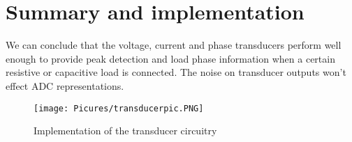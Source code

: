 


\vspace{-1cm}

\section{Summary and implementation}
We can conclude that the voltage, current and phase transducers perform well enough to provide peak detection and load phase information when a certain resistive or capacitive load is connected. The noise on transducer outputs won't effect ADC representations.

\begin{figure}[H]
    \centering
  	\texttt{[image: Picures/transducerpic.PNG]}
	\caption{Implementation of the transducer circuitry} \label{subfig:transducer_pcb}
 \end{figure}